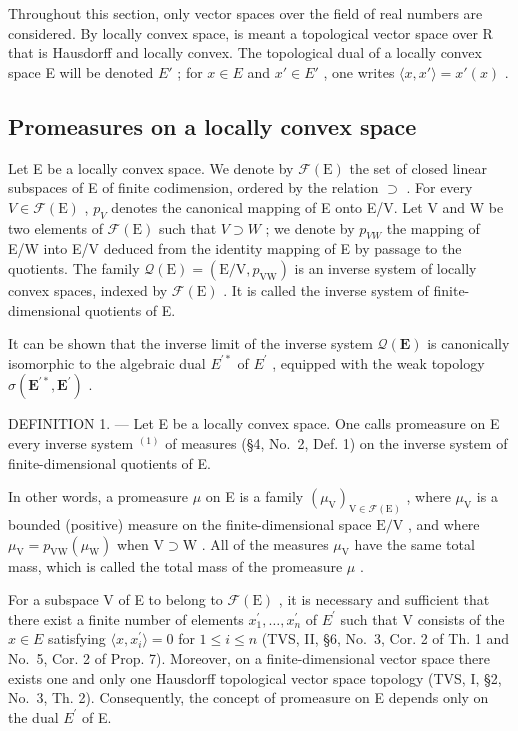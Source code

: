 Throughout this section, only vector spaces over the field of real numbers are considered. By locally convex space, is meant a topological vector space over R that is Hausdorff and locally convex. The topological dual of a locally convex space E will be denoted \(E'\) ; for \(x \in E\) and \(x' \in E'\) , one writes \(\langle x, x' \rangle = x'(x)\) .

\subsection{Promeasures on a locally convex space}

Let E be a locally convex space. We denote by \(\mathcal{F}(\mathrm{E})\) the set of closed linear subspaces of E of finite codimension, ordered by the relation \(\supset\) . For every \(V \in \mathcal{F}(\mathrm{E})\) , \(p_{V}\) denotes the canonical mapping of E onto E/V. Let V and W be two elements of \(\mathcal{F}(\mathrm{E})\) such that \(V \supset W\) ; we denote by \(p_{VW}\) the mapping of E/W into E/V deduced from the identity mapping of E by passage to the quotients. The family \(\mathcal{Q}(\mathrm{E}) = (\mathrm{E}/\mathrm{V}, p_{\mathrm{VW}})\) is an inverse system of locally convex spaces, indexed by \(\mathcal{F}(\mathrm{E})\) . It is called the inverse system of finite-dimensional quotients of E.

It can be shown that the inverse limit of the inverse system \(\mathcal{Q}(\mathbf{E})\) is canonically isomorphic to the algebraic dual \(E^{\prime*}\) of \(E^{\prime}\) , equipped with the weak topology \(\sigma(\mathbf{E}^{\prime*},\mathbf{E}^{\prime})\) .

DEFINITION 1. --- Let E be a locally convex space. One calls promeasure on E every inverse system \(^{(1)}\) of measures (§4, No.~2, Def. 1) on the inverse system of finite-dimensional quotients of E.

In other words, a promeasure \(\mu\) on E is a family \((\mu_{\mathrm{V}})_{\mathrm{V}\in \mathcal{F}(\mathrm{E})}\) , where \(\mu_{\mathrm{V}}\) is a bounded (positive) measure on the finite-dimensional space \(\mathrm{E / V}\) , and where \(\mu_{\mathrm{V}} = p_{\mathrm{VW}}(\mu_{\mathrm{W}})\) when \(\mathrm{V}\supset \mathrm{W}\) . All of the measures \(\mu_{\mathrm{V}}\) have the same total mass, which is called the total mass of the promeasure \(\mu\) .

For a subspace V of E to belong to \(\mathcal{F}(\mathrm{E})\) , it is necessary and sufficient that there exist a finite number of elements \(x_{1}^{\prime},\ldots,x_{n}^{\prime}\) of \(E^{\prime}\) such that V consists of the \(x\in E\) satisfying \(\langle x,x_{i}^{\prime}\rangle=0\) for \(1\leqslant i\leqslant n\) (TVS, II, §6, No.~3, Cor. 2 of Th. 1 and No.~5, Cor. 2 of Prop. 7). Moreover, on a finite-dimensional vector space there exists one and only one Hausdorff topological vector space topology (TVS, I, §2, No.~3, Th. 2). Consequently, the concept of promeasure on E depends only on the dual \(E^{\prime}\) of E.

